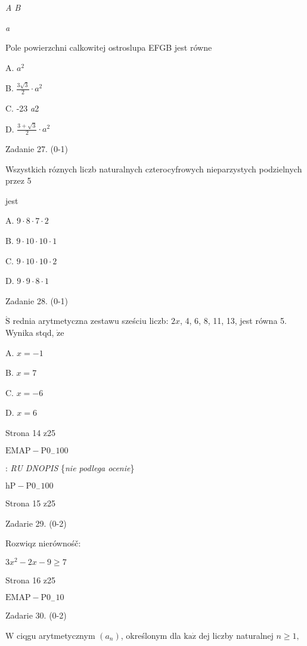 \documentclass[a4paper,12pt]{article}
\begin{document}
{\it A  B}

{\it a}

Pole powierzchni calkowitej ostroslupa EFGB jest równe

A. $a^{2}$

B. $\displaystyle \frac{3\sqrt{3}}{2}\cdot a^{2}$

C. -23 {\it a}2

D. $\displaystyle \frac{3+\sqrt{3}}{2}\cdot a^{2}$

Zadanie 27. (0-1)

Wszystkich róznych liczb naturalnych czterocyfrowych nieparzystych podzielnych przez 5

jest

A. $9\cdot 8\cdot 7\cdot 2$

B. $9\cdot 10\cdot 10\cdot 1$

C. $9\cdot 10\cdot 10\cdot 2$

D. $9\cdot 9\cdot 8\cdot 1$

Zadanie 28. (0-1)

$\acute{\mathrm{S}}$ rednia arytmetyczna zestawu sześciu liczb: $2x$, 4, 6, 8, 11, 13, jest równa 5. Wynika stqd, $\dot{\mathrm{z}}\mathrm{e}$

A. $x=-1$

B. $x=7$

C. $x=-6$

D. $x=6$

Strona 14 z25

$\mathrm{E}\mathrm{M}\mathrm{A}\mathrm{P}-\mathrm{P}0_{-}100$





: {\it RU DNOPIS} \{{\it nie podlega ocenie}\}

$\mathrm{h}\mathrm{P}-\mathrm{P}0_{-}100$

Strona 15 z25





Zadarie 29. (0-2)

Rozwiqz nierównośč:

$3x^{2}-2x-9\geq 7$

Strona 16 z25

$\mathrm{E}\mathrm{M}\mathrm{A}\mathrm{P}-\mathrm{P}0_{-}10$





Zadarie 30. (0-2)

$\mathrm{W}$ ciqgu arytmetycznym $(a_{n})$, określonym dla $\mathrm{k}\mathrm{a}\dot{\mathrm{z}}$ dej liczby naturalnej $n\geq 1,$
\end{document}
